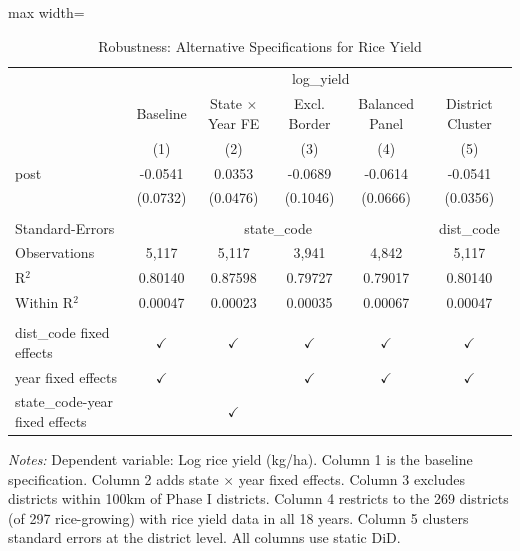 
\begin{table}[htbp]
   \caption{\label{tab:robustness_rice} Robustness: Alternative Specifications for Rice Yield}
   \bigskip
   \centering
   \begin{adjustbox}{max width=\textwidth}
   \begin{tabular}{lccccc}
      \toprule
       & \multicolumn{5}{c}{log\_yield}\\
                                      & Baseline      & State $\times$ Year FE  & Excl. Border  & Balanced Panel & District Cluster \\   
                                      & (1)           & (2)                     & (3)           & (4)            & (5)\\  
      \midrule 
      post                            & -0.0541       & 0.0353                  & -0.0689       & -0.0614        & -0.0541\\   
                                      & (0.0732)      & (0.0476)                & (0.1046)      & (0.0666)       & (0.0356)\\   
       \\
      Standard-Errors & \multicolumn{4}{c}{state\_code} & dist\_code \\ 
      Observations                    & 5,117         & 5,117                   & 3,941         & 4,842          & 5,117\\  
      R$^2$                           & 0.80140       & 0.87598                 & 0.79727       & 0.79017        & 0.80140\\  
      Within R$^2$                    & 0.00047       & 0.00023                 & 0.00035       & 0.00067        & 0.00047\\  
       \\
      dist\_code fixed effects        & $\checkmark$  & $\checkmark$            & $\checkmark$  & $\checkmark$   & $\checkmark$\\   
      year fixed effects              & $\checkmark$  &                         & $\checkmark$  & $\checkmark$   & $\checkmark$\\   
      state\_code-year fixed effects  &               & $\checkmark$            &               &                & \\  
      \bottomrule
   \end{tabular}
   \end{adjustbox}

   \par \raggedright \footnotesize
   \textit{Notes:} Dependent variable: Log rice yield (kg/ha). Column 1 is the baseline specification. Column 2 adds state $\times$ year fixed effects. Column 3 excludes districts within 100km of Phase I districts. Column 4 restricts to the 269 districts (of 297 rice-growing) with rice yield data in all 18 years. Column 5 clusters standard errors at the district level. All columns use static DiD.
\end{table}


